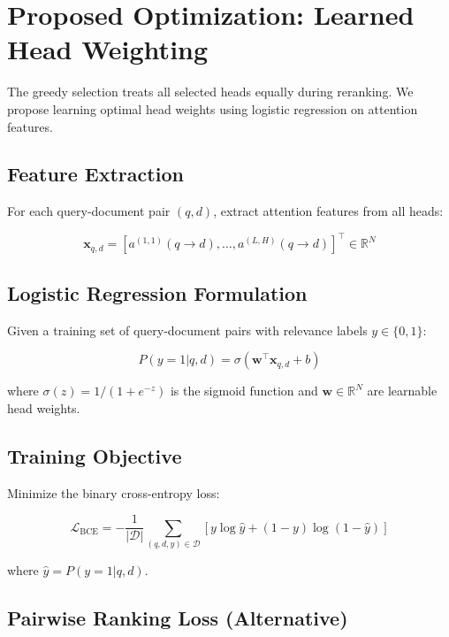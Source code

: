 \documentclass[11pt,a4paper]{article}
\begin{document}
\section{Proposed Optimization: Learned Head Weighting}

The greedy selection treats all selected heads equally during reranking. We propose learning optimal head weights using logistic regression on attention features.

\subsection{Feature Extraction}

For each query-document pair $(q, d)$, extract attention features from all heads:

\begin{equation}
    \mathbf{x}_{q,d} = \left[ a^{(1,1)}(q \rightarrow d), \ldots, a^{(L,H)}(q \rightarrow d) \right]^\top \in \mathbb{R}^{N}
\end{equation}

\subsection{Logistic Regression Formulation}

Given a training set of query-document pairs with relevance labels $y \in \{0, 1\}$:

\begin{equation}
    P(y=1 | q, d) = \sigma\left(\mathbf{w}^\top \mathbf{x}_{q,d} + b\right)
\end{equation}

where $\sigma(z) = 1/(1+e^{-z})$ is the sigmoid function and $\mathbf{w} \in \mathbb{R}^{N}$ are learnable head weights.

\subsection{Training Objective}

Minimize the binary cross-entropy loss:

\begin{equation}
    \mathcal{L}_{\text{BCE}} = -\frac{1}{|\mathcal{D}|} \sum_{(q,d,y) \in \mathcal{D}} \left[ y \log \hat{y} + (1-y) \log(1-\hat{y}) \right]
\end{equation}

where $\hat{y} = P(y=1|q,d)$.

\subsection{Pairwise Ranking Loss (Alternative)}
\end{document}
